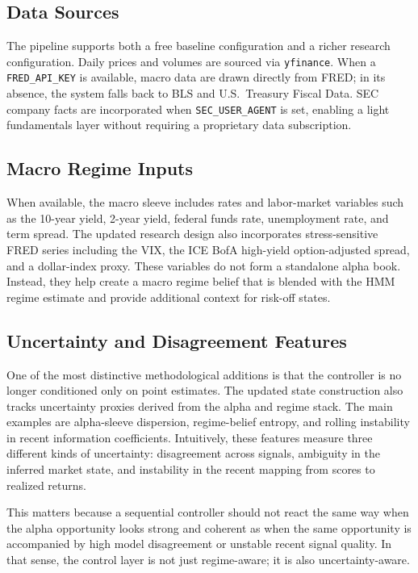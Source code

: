 \documentclass[11pt]{article}
\begin{document}
\subsection{Data Sources}

The pipeline supports both a free baseline configuration and a richer research
configuration. Daily prices and volumes are sourced via \texttt{yfinance}. When a
\texttt{FRED\_API\_KEY} is available, macro data are drawn directly from FRED; in
its absence, the system falls back to BLS and U.S.\ Treasury Fiscal Data. SEC
company facts are incorporated when \texttt{SEC\_USER\_AGENT} is set, enabling a
light fundamentals layer without requiring a proprietary data subscription.

\subsection{Macro Regime Inputs}

When available, the macro sleeve includes rates and labor-market variables such
as the 10-year yield, 2-year yield, federal funds rate, unemployment rate, and
term spread. The updated research design also incorporates stress-sensitive FRED
series including the VIX, the ICE BofA high-yield option-adjusted spread, and a
dollar-index proxy. These variables do not form a standalone alpha book.
Instead, they help create a macro regime belief that is blended with the HMM
regime estimate and provide additional context for risk-off states.

\subsection{Uncertainty and Disagreement Features}

One of the most distinctive methodological additions is that the controller is
no longer conditioned only on point estimates. The updated state construction
also tracks uncertainty proxies derived from the alpha and regime stack. The
main examples are alpha-sleeve dispersion, regime-belief entropy, and rolling
instability in recent information coefficients. Intuitively, these features
measure three different kinds of uncertainty: disagreement across signals,
ambiguity in the inferred market state, and instability in the recent mapping
from scores to realized returns.

This matters because a sequential controller should not react the same way when
the alpha opportunity looks strong and coherent as when the same opportunity is
accompanied by high model disagreement or unstable recent signal quality. In
that sense, the control layer is not just regime-aware; it is also
uncertainty-aware.
\end{document}
